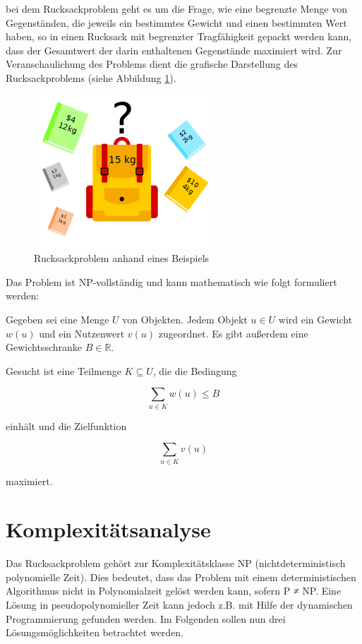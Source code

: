\documentclass[12pt]{report}
\begin{document}
bei dem Rucksackproblem geht es um die Frage, wie eine begrenzte Menge von Gegenständen, die jeweils ein bestimmtes Gewicht und einen bestimmten Wert haben, so in einen Rucksack mit begrenzter Tragfähigkeit gepackt werden kann, dass der Gesamtwert der darin enthaltenen Gegenstände maximiert wird. Zur Veranschaulichung des Problems dient die grafische Darstellung des Rucksackproblems (siehe Abbildung \ref{fig:rucksackproblem}). 

\begin{figure}[h]
	\centering
	\includegraphics[width=0.5 \linewidth]{Knapsack_Problem_Illustration}
	\caption{Rucksackproblem anhand eines Beispiels}
	\label{fig:rucksackproblem}
\end{figure}

Das Problem ist NP-vollständig und kann mathematisch wie folgt formuliert werden:

Gegeben sei eine Menge $U$ von Objekten. Jedem Objekt $u \in U$ wird ein Gewicht $w(u)$ und ein Nutzenwert $v(u)$ zugeordnet. Es gibt außerdem eine Gewichtsschranke $B \in \mathbb{R}$.

Gesucht ist eine Teilmenge $K \subseteq U$, die die Bedingung

$$\sum_{u \in K} w(u) \leq B$$

einhält und die Zielfunktion

$$\sum_{u \in K} v(u)$$

maximiert. \cite{kellerer2004knapsack}

\section{Komplexitätsanalyse}
Das Rucksackproblem gehört zur Komplexitätsklasse NP (nichtdeterministisch polynomielle Zeit). Dies bedeutet, dass das Problem mit einem deterministischen Algorithmus nicht in Polynomialzeit gelöst werden kann, sofern P ≠ NP. Eine Lösung in pseudopolynomieller Zeit kann jedoch z.B. mit Hilfe der dynamischen Programmierung gefunden werden. \cite{assi8672677}
Im Folgenden sollen nun drei Lösungsmöglichkeiten betrachtet werden.
\end{document}
